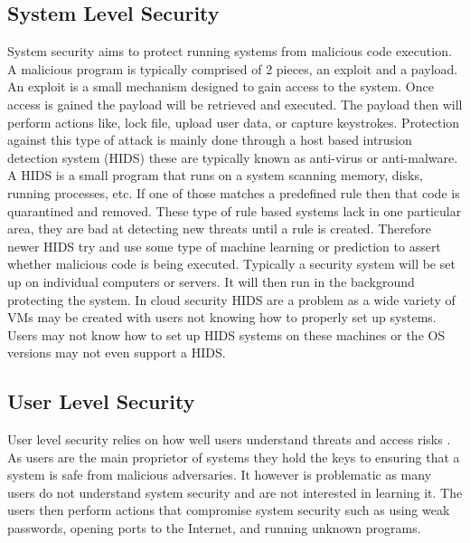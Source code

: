 \documentclass[12pt]{article}
\begin{document}
\subsection{System Level Security}
System security aims to protect running systems from malicious code execution. A malicious program is typically comprised of 2 pieces, an exploit and a payload. An exploit is a small mechanism designed to gain access to the system. Once access is gained the payload will be retrieved and executed. The payload then will perform actions like, lock file, upload user data, or capture keystrokes. Protection against this type of attack is mainly done through a host based intrusion detection system (HIDS) these are typically known as anti-virus or anti-malware. A HIDS is a small program that runs on a system scanning memory, disks, running processes, etc. If one of those matches a predefined rule then that code is quarantined and removed. These type of rule based systems lack in one particular area, they are bad at detecting new threats until a rule is created. Therefore newer HIDS try and use some type of machine learning or prediction to assert whether malicious code is being executed. Typically a security system will be set up on individual computers or servers. It will then run in the background protecting the system. In cloud security HIDS are a problem \cite{modi2013survey} as a wide variety of VMs may be created with users not knowing how to properly set up systems. Users may not know how to set up HIDS systems on these machines or the OS versions may not even support a HIDS.

\subsection{User Level Security}
User level security relies on how well users understand threats and access risks \cite{stanton2005analysis}. As users are the main proprietor of systems they hold the keys to ensuring that a system is safe from malicious adversaries. It however is problematic as many users do not understand system security and are not interested in learning it. The users then perform actions that compromise system security such as using weak passwords, opening ports to the Internet, and running unknown programs.
\end{document}
